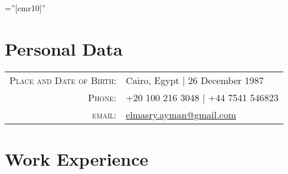 \documentclass[a4paper,11pt]{article} %
\begin{document}
\pagestyle{empty} %

\font\fb=''[cmr10]'' %


\par{\bigskip\par} %

\vspace{-0.3cm}
\section{Personal Data}

\begin{tabular}{rl}
\textsc{Place and Date of Birth:} & Cairo, Egypt | 26 December 1987 \\
\textsc{Phone:} & +20 100 216 3048 | +44 7541 546823 \\
\textsc{email:} & \href{mailto:elmasry.ayman@gmail.com}{elmasry.ayman@gmail.com}
\end{tabular}


\section{Work Experience}
\end{document}
